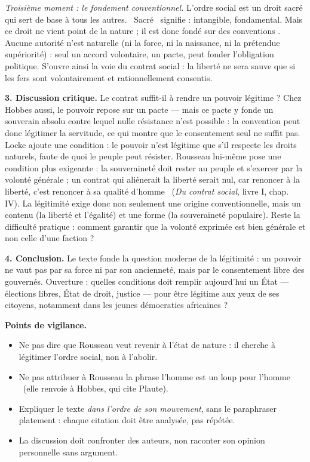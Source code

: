 \documentclass[11pt]{article}
\begin{document}
\begin{corrige}
\emph{Troisième moment : le fondement conventionnel.} \guillemotleft L'ordre social est un droit sacré qui sert de base à tous les autres. \guillemotright\ \guillemotleft Sacré \guillemotright\ signifie : intangible, fondamental. Mais \guillemotleft ce droit ne vient point de la nature ; il est donc fondé sur des conventions \guillemotright. Aucune autorité n'est naturelle (ni la force, ni la naissance, ni la prétendue supériorité) : seul un accord volontaire, un pacte, peut fonder l'obligation politique. S'ouvre ainsi la voie du contrat social : la liberté ne sera sauve que si les fers sont volontairement et rationnellement consentis.

\textbf{3. Discussion critique.} Le contrat suffit-il à rendre un pouvoir légitime ? Chez Hobbes aussi, le pouvoir repose sur un pacte — mais ce pacte y fonde un souverain absolu contre lequel nulle résistance n'est possible : la convention peut donc légitimer la servitude, ce qui montre que le consentement seul ne suffit pas. Locke ajoute une condition : le pouvoir n'est légitime que s'il respecte les droits naturels, faute de quoi le peuple peut résister. Rousseau lui-même pose une condition plus exigeante : la souveraineté doit rester au peuple et s'exercer par la volonté générale ; un contrat qui aliénerait la liberté serait nul, car \guillemotleft renoncer à la liberté, c'est renoncer à sa qualité d'homme \guillemotright\ (\emph{Du contrat social}, livre I, chap. IV). La légitimité exige donc non seulement une origine conventionnelle, mais un contenu (la liberté et l'égalité) et une forme (la souveraineté populaire). Reste la difficulté pratique : comment garantir que la volonté exprimée est bien générale et non celle d'une faction ?

\textbf{4. Conclusion.} Le texte fonde la question moderne de la légitimité : un pouvoir ne vaut pas par sa force ni par son ancienneté, mais par le consentement libre des gouvernés. Ouverture : quelles conditions doit remplir aujourd'hui un État — élections libres, État de droit, justice — pour être légitime aux yeux de ses citoyens, notamment dans les jeunes démocraties africaines ?

\textbf{Points de vigilance.}
\begin{itemize}
\item Ne pas dire que Rousseau veut \guillemotleft revenir à l'état de nature \guillemotright : il cherche à légitimer l'ordre social, non à l'abolir.
\item Ne pas attribuer à Rousseau la phrase \guillemotleft l'homme est un loup pour l'homme \guillemotright\ (elle renvoie à Hobbes, qui cite Plaute).
\item Expliquer le texte \emph{dans l'ordre de son mouvement}, sans le paraphraser platement : chaque citation doit être analysée, pas répétée.
\item La discussion doit confronter des auteurs, non raconter son opinion personnelle sans argument.
\end{itemize}

\end{corrige}
\end{document}
